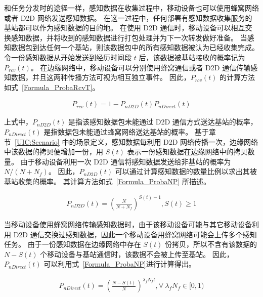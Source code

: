 和任务分发时的途径一样，感知数据在收集过程中，移动设备也可以使用蜂窝网络或者 D2D 网络发送感知数据。
在这一过程中，任何部署有感知数据收集服务的基站都可以作为感知数据的目的地。
在使用 D2D 通信时，移动设备可以相互交换感知数据，并将收到的感知数据进行打包处理并为下一次转发做好准备。
当感知数据包到达任何一个基站，则该数据包中的所有感知数据被认为已经收集完成。
令一份感知数据从开始发送到经历时间段 $t$ 后，该数据被基站接收的概率记为 $P_{rcv}(t)$。
在边缘网络中，移动设备可以分别使用蜂窝通信或者 D2D 通信传输感知数据，并且这两种传播方法可视为相互独立事件。
因此，$P_{rcv}(t)$ 的计算方法如式~\eqref{Formula_ProbaRcvT}。

\vspace{-1em}
\begin{equation}
  \label{Formula_ProbaRcvT}
  \begin{aligned}
    P_{rcv}(t) = 1 - P_{nD2D}(t) P_{nDirect}(t)
  \end{aligned}
\end{equation}

上式中，$P_{nD2D}(t)$ 是指该感知数据包未能通过 D2D 通信方式送达基站的概率，$P_{nDirect}(t)$ 是指数据包未能通过蜂窝网络送达基站的概率。
基于章节~\ref{UIC:Scenario} 中的场景定义，感知数据每利用 D2D 网络传播一次，边缘网络中该数据的拷贝便增加一份，用 $S(t)$ 表示一份感知数据在边缘网络中的拷贝数量。
由于移动设备利用一次 D2D 通信将感知数据发送给非基站的概率为 $N/(N + N_f)$。
因此，$P_{nD2D}(t)$ 可以通过计算感知数据的数量比例以求出其被基站收集的概率。
其计算方法如式~\eqref{Formula_ProbaNP} 所描述。

\begin{equation}
  \label{Formula_ProbaNP}
  \begin{aligned}
  P_{nD2D}(t) = (\frac{N}{N + N_f})^{S(t) - 1}, S(t) \geq 1
  \end{aligned}
\end{equation}

当移动设备使用蜂窝网络传输感知数据时，由于该移动设备可能与其它移动设备利用 D2D 通信交换过感知数据，因此一个移动设备用蜂窝网络可能会上传多个感知任务。
由于一份感知数据在边缘网络中存在 $S(t)$ 份拷贝，所以不含有该数据的 $N - S(t)$ 个移动设备与基站通信时，该数据不会被上传至基站。
因此，$P_{nDirect}(t)$ 可以利用式~\eqref{Formula_ProbaNP}进行计算得出。

\begin{equation}
  \label{Formula_ProbaNA}
  \begin{aligned}
  P_{nDirect}(t) = (\frac{N-S(t)}{N})^{\lambda_f N_f t}, \forall \ \lambda_f N_f \in [0,1)
  \end{aligned}
\end{equation}

